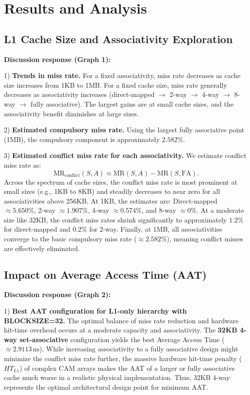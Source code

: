 \documentclass[12pt]{article}
\begin{document}
\pagebreak
\section{Results and Analysis}

\subsection{L1 Cache Size and Associativity Exploration}

\textbf{Discussion response (Graph 1):}

1) \textbf{Trends in miss rate.} For a fixed associativity, miss rate decreases as cache size increases from 1KB to 1MB. For a fixed cache size, miss rate generally decreases as associativity increases (direct-mapped $\rightarrow$ 2-way $\rightarrow$ 4-way $\rightarrow$ 8-way $\rightarrow$ fully associative). The largest gains are at small cache sizes, and the associativity benefit diminishes at large sizes.

2) \textbf{Estimated compulsory miss rate.} Using the largest fully associative point (1MB), the compulsory component is approximately $2.582\%$.

3) \textbf{Estimated conflict miss rate for each associativity.} We estimate conflict miss rate as:
\[
\text{MR}_{\text{conflict}}(S,A) \approx \text{MR}(S,A) - \text{MR}(S,\text{FA}).
\]
Across the spectrum of cache sizes, the conflict miss rate is most prominent at small sizes (e.g., 1KB to 8KB) and steadily decreases to near zero for all associativities above 256KB. At 1KB, the estimates are: Direct-mapped $\approx 5.650\%$, 2-way $\approx 1.907\%$, 4-way $\approx 0.574\%$, and 8-way $\approx 0\%$. At a moderate size like 32KB, the conflict miss rates shrink significantly to approximately $1.2\%$ for direct-mapped and $0.2\%$ for 2-way. Finally, at 1MB, all associativities converge to the basic compulsory miss rate ($\approx 2.582\%$), meaning conflict misses are effectively eliminated.

\pagebreak
\subsection{Impact on Average Access Time (AAT)}

\textbf{Discussion response (Graph 2):}

1) \textbf{Best AAT configuration for L1-only hierarchy with BLOCKSIZE=32.} The optimal balance of miss rate reduction and hardware hit-time overhead occurs at a moderate capacity and associativity. The \textbf{32KB 4-way set-associative} configuration yields the best Average Access Time ($\approx 2.9113\,\text{ns}$). While increasing associativity to a fully associative design might minimize the conflict miss rate further, the massive hardware hit-time penalty ($HT_{L1}$) of complex CAM arrays makes the AAT of a larger or fully associative cache much worse in a realistic physical implementation. Thus, 32KB 4-way represents the optimal architectural design point for minimum AAT.
\end{document}
